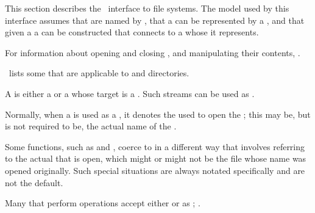 

This section describes the \clisp\ interface to file systems.
The model used by this interface assumes 
     that  are named by ,
     that a  can be represented by a  , 
 and that given a  a  can be constructed 
      that connects to a  whose  it represents.

For information about opening and closing ,
and manipulating their contents, \seechapter\Streams.

\Thenextfigure\ lists some  
that are applicable to  and directories.



A  is either a 
or a  whose target is a .
Such streams can be used as .

Normally, when a  is used as a
, it denotes the  used to 
open the ; this may be, but is not required to be, the
actual name of the .

Some functions, such as  and ,
coerce  to  in a different way that 
involves referring to the actual  that is open, which might
or might not be the file whose name was opened originally.  Such special
situations are always notated specifically and are not the default.

\endsubsection%



Many  that perform  operations accept either
 or   as ;
\seesection\StreamArgsToStandardizedFns.

